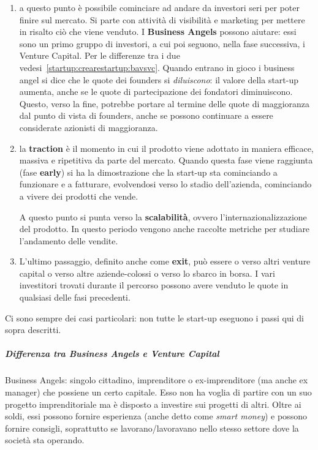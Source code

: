 \begin{enumerate}
Gli \textbf{FFF}\footnote{Ovvero i \textit{friendly, friends and fools},
indicando rispettivamente i parenti/persone strette, gli amici e gli ``stolti''
ovvero chi si fa convincere d'investire subito nell'azienda.} possono aiutare
nella fase di bootstrap.

 \item a questo punto è possibile cominciare ad andare da investori seri per
poter finire sul mercato. Si parte con attività di visibilità e marketing per
mettere in risalto ciò che viene venduto. I \textbf{Business Angels} possono
aiutare: essi sono un primo gruppo di investori, a cui poi seguono, nella fase
successiva, i Venture Capital. Per le differenze tra i due
vedesi~\ref{startup:crearestartup:bavsvc}. Quando entrano in gioco i business
angel si dice che le quote dei founders si \textit{diluiscono}: il valore della
start-up aumenta, anche se le quote di partecipazione dei fondatori
diminuiscono. Questo, verso la fine, potrebbe portare al termine delle quote di
maggioranza dal punto di vista di founders, anche se possono continuare a
essere considerate azionisti di maggioranza.

 \item la \textbf{traction} è il momento in cui il prodotto viene adottato in
maniera efficace, massiva e ripetitiva da parte del mercato. Quando questa fase
viene raggiunta (fase \textbf{early}) si ha la dimostrazione che la start-up
sta cominciando a funzionare e a fatturare, evolvendosi verso lo stadio
dell'azienda, cominciando a vivere dei prodotti che vende.

A questo punto si punta verso la \textbf{scalabilità}, ovvero
l'internazionalizzazione del prodotto. In questo periodo vengono anche raccolte
metriche per studiare l'andamento delle vendite.

 \item L'ultimo passaggio, definito anche come \textbf{exit}, può essere o
verso altri venture capital o verso altre aziende-colossi o verso lo
sbarco in borsa. I vari investitori trovati durante il percorso possono avere
venduto le quote in qualsiasi delle fasi precedenti.

\end{enumerate}

Ci sono sempre dei casi particolari: non tutte le start-up eseguono i passi qui
di sopra descritti.

\subparagraph*{Differenza tra Business Angels e Venture Capital}
\label{startup:crearestartup:bavsvc}
Business Angels: singolo cittadino, imprenditore o ex-imprenditore (ma anche ex
manager) che possiene un certo capitale. Esso non ha voglia di partire con un
suo progetto imprenditoriale ma è disposto a investire sui progetti di altri.
Oltre ai soldi, essi possono fornire esperienza (anche detto come \textit{smart
money}) e possono fornire consigli, soprattutto se lavorano/lavoravano nello
stesso settore dove la società sta operando.

